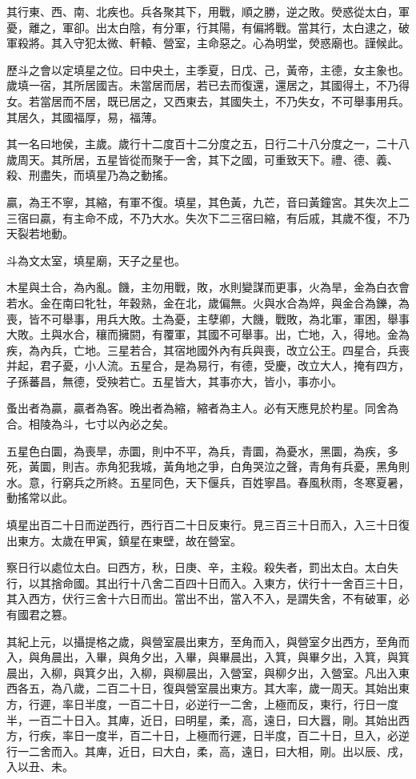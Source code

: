 其行東、西、南、北疾也。兵各聚其下，用戰，順之勝，逆之敗。熒惑從太白，軍憂，離之，軍卻。出太白陰，有分軍，行其陽，有偏將戰。當其行，太白逮之，破軍殺將。其入守犯太微、軒轅、營室，主命惡之。心為明堂，熒惑廟也。謹候此。

歷斗之會以定填星之位。曰中央土，主季夏，日戊、己，黃帝，主德，女主象也。歲填一宿，其所居國吉。未當居而居，若已去而復還，還居之，其國得土，不乃得女。若當居而不居，既已居之，又西東去，其國失土，不乃失女，不可舉事用兵。其居久，其國福厚，易，福薄。

其一名曰地侯，主歲。歲行十二度百十二分度之五，日行二十八分度之一，二十八歲周天。其所居，五星皆從而聚于一舍，其下之國，可重致天下。禮、德、義、殺、刑盡失，而填星乃為之動搖。

贏，為王不寧，其縮，有軍不復。填星，其色黃，九芒，音曰黃鐘宮。其失次上二三宿曰贏，有主命不成，不乃大水。失次下二三宿曰縮，有后戚，其歲不復，不乃天裂若地動。

斗為文太室，填星廟，天子之星也。

木星與土合，為內亂。饑，主勿用戰，敗，水則變謀而更事，火為旱，金為白衣會若水。金在南曰牝牡，年穀熟，金在北，歲偏無。火與水合為焠，與金合為鑠，為喪，皆不可舉事，用兵大敗。土為憂，主孽卿，大饑，戰敗，為北軍，軍困，舉事大敗。土與水合，穰而擁閼，有覆軍，其國不可舉事。出，亡地，入，得地。金為疾，為內兵，亡地。三星若合，其宿地國外內有兵與喪，改立公王。四星合，兵喪并起，君子憂，小人流。五星合，是為易行，有德，受慶，改立大人，掩有四方，子孫蕃昌，無德，受殃若亡。五星皆大，其事亦大，皆小，事亦小。

蚤出者為贏，贏者為客。晚出者為縮，縮者為主人。必有天應見於杓星。同舍為合。相陵為斗，七寸以內必之矣。

五星色白圜，為喪旱，赤圜，則中不平，為兵，青圜，為憂水，黑圜，為疾，多死，黃圜，則吉。赤角犯我城，黃角地之爭，白角哭泣之聲，青角有兵憂，黑角則水。意，行窮兵之所終。五星同色，天下偃兵，百姓寧昌。春風秋雨，冬寒夏暑，動搖常以此。

填星出百二十日而逆西行，西行百二十日反東行。見三百三十日而入，入三十日復出東方。太歲在甲寅，鎮星在東壁，故在營室。

察日行以處位太白。曰西方，秋，日庚、辛，主殺。殺失者，罰出太白。太白失行，以其捨命國。其出行十八舍二百四十日而入。入東方，伏行十一舍百三十日，其入西方，伏行三舍十六日而出。當出不出，當入不入，是謂失舍，不有破軍，必有國君之篡。

其紀上元，以攝提格之歲，與營室晨出東方，至角而入，與營室夕出西方，至角而入，與角晨出，入畢，與角夕出，入畢，與畢晨出，入箕，與畢夕出，入箕，與箕晨出，入柳，與箕夕出，入柳，與柳晨出，入營室，與柳夕出，入營室。凡出入東西各五，為八歲，二百二十日，復與營室晨出東方。其大率，歲一周天。其始出東方，行遲，率日半度，一百二十日，必逆行一二舍，上極而反，東行，行日一度半，一百二十日入。其庳，近日，曰明星，柔，高，遠日，曰大囂，剛。其始出西方，行疾，率日一度半，百二十日，上極而行遲，日半度，百二十日，旦入，必逆行一二舍而入。其庳，近日，曰大白，柔，高，遠日，曰大相，剛。出以辰、戌，入以丑、未。


